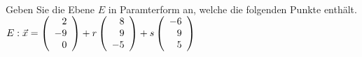 \begin{aufgabe} ~ \\ 
Geben Sie die Ebene $E$ in Paramterform an, welche die folgenden Punkte enthält.$E: \vec{x}=\Vekd{2}{-9}{0} + r\Vekd{8}{9}{-5}+ s\Vekd{-6}{9}{5}$\end{aufgabe} 
